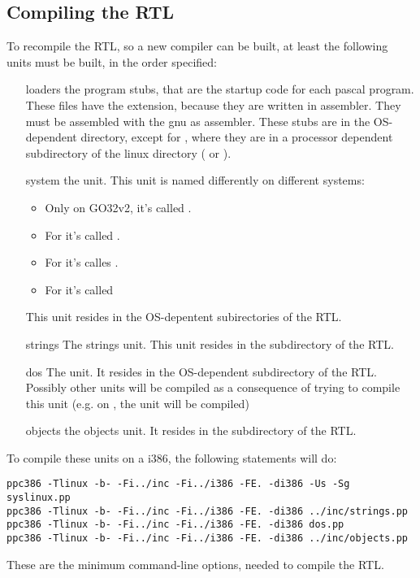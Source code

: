 \documentclass{report}
\begin{document}
\subsection{Compiling the RTL}
To recompile the RTL, so a new compiler can be built, at least the following 
units must be built, in the order specified:
\begin{enumerate}
\item[loaders] the program stubs, that are the startup code for each pascal
program. These files have the  extension, because they are written
in assembler. They must be assembled with the gnu as assembler. These stubs
are in the OS-dependent directory, except for \linux, where they are in a
processor dependent subdirectory of the linux directory ( or
).
\item[system] the  unit. This unit is named differently on different
systems:
\begin{itemize}
\item Only on GO32v2, it's called .
\item For \linux it's called .
\item For \windowsnt it's calles .
\item For \ostwo it's called 
\end{itemize}
This unit resides in the OS-depentent subirectories of the RTL.
\item[strings] The strings unit. This unit resides in the 
subdirectory of the RTL.
\item[dos] The  unit. It resides in the OS-dependent subdirectory
of the RTL. Possibly other units will be compiled as a consequence of trying
to compile this unit (e.g. on \linux, the  unit will be compiled)
\item[objects] the objects unit. It resides in the  subdirectory
of the RTL.
\end{enumerate}
To compile these units on a i386, the following statements will do:
\begin{verbatim}
ppc386 -Tlinux -b- -Fi../inc -Fi../i386 -FE. -di386 -Us -Sg syslinux.pp 
ppc386 -Tlinux -b- -Fi../inc -Fi../i386 -FE. -di386 ../inc/strings.pp 
ppc386 -Tlinux -b- -Fi../inc -Fi../i386 -FE. -di386 dos.pp 
ppc386 -Tlinux -b- -Fi../inc -Fi../i386 -FE. -di386 ../inc/objects.pp 
\end{verbatim}
These are the minimum command-line options, needed to compile the RTL.
\end{document}
